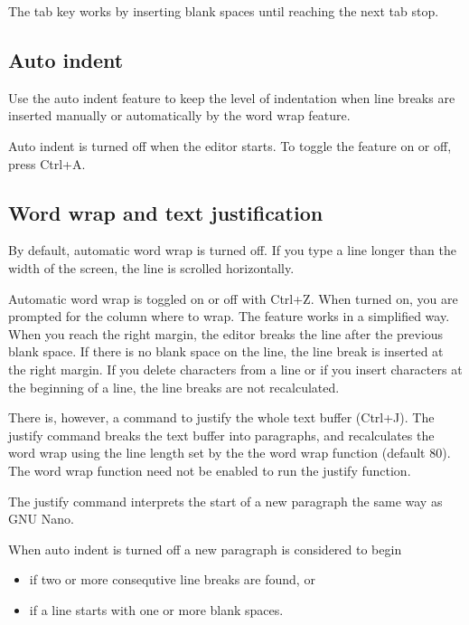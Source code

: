 \documentclass{article}
\begin{document}
        The tab key works by inserting blank spaces until reaching the next tab stop.

    \subsection{Auto indent}
    
        Use the auto indent feature to keep the level of indentation when line breaks are inserted manually or automatically by
        the word wrap feature.

        Auto indent is turned off when the editor starts. To toggle the feature on or off, press Ctrl+A.
    
    \subsection{Word wrap and text justification}
    \label{wordwrap}

        By default, automatic word wrap is turned off. If you type a line longer than the width of the screen, the line
        is scrolled horizontally.

        Automatic word wrap is toggled on or off with Ctrl+Z. When turned on, you are prompted for the column where
        to wrap. The feature works in a simplified way. When you reach the right margin, the editor breaks the
        line after the previous blank space. If there is no blank space on the line, the line break is inserted
        at the right margin. If you delete characters from a line or if you insert characters at the beginning of a line,
        the line breaks are not recalculated.

        There is, however, a command to justify the whole text buffer (Ctrl+J). The justify command breaks the text buffer into
        paragraphs, and recalculates the word wrap using the line length set by the the word wrap function (default 80). The
        word wrap function need not be enabled to run the justify function.

        The justify command interprets the start of a new paragraph the same way as GNU Nano. 
        
        When auto indent is turned off a new paragraph is considered to begin

        \begin{itemize}
		    \item if two or more consequtive line breaks are found, or
		    \item if a line starts with one or more blank spaces.
	    \end{itemize}
\end{document}

